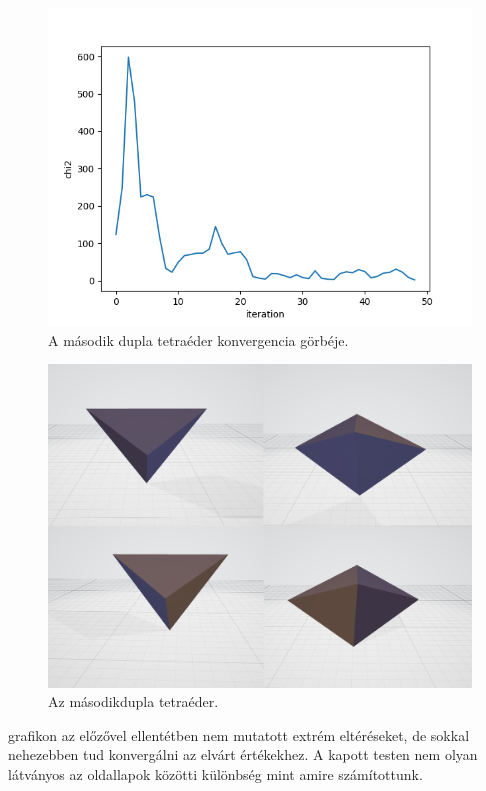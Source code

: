 \begin{figure}[h!]
	\centering
	\includegraphics[scale=0.7]{images/doubletetrahedron_02.png}
	\caption{A második dupla tetraéder konvergencia görbéje.}
	\label{fig:doubletetra02}
\end{figure}

\begin{figure}[h!]
	\centering
	\includegraphics[width=\textwidth]{images/double02obj.png}
	\caption{Az másodikdupla tetraéder.}
	\label{fig:double02obj}
\end{figure}

 grafikon az előzővel ellentétben nem mutatott extrém eltéréseket, de sokkal nehezebben tud konvergálni az elvárt értékekhez.
A kapott testen nem olyan látványos az oldallapok közötti különbség mint amire számítottunk.

